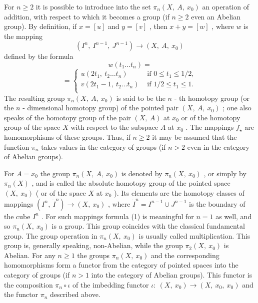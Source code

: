 For $  n \geq 2 $ 
it is possible to introduce into the set $  \pi _{n} ( X ,\  A ,\  x _{0} ) $ 
an operation of addition, with respect to which it becomes a group (if $  n \geq 2 $ 
even an Abelian group). By definition, if $  x = [ u ] $ 
and $  y = [ v ] $ , 
then $  x + y = [ w ] $ , 
where $  w $ 
is the mapping$$ 
( I ^{n} ,\  I ^{n-1} ,\  J ^{n-1} )  
\rightarrow   ( X ,\  A ,\  x _{0} )
 $$ 
defined by the formula$$ \tag{1}
w ( t _{1} \dots t _{n} )  =
 $$ 
$$ 
=  
\left \{ 
\begin{array}{ll}
u ( 2 t _{1} ,\  t _{2} \dots t _{n} )  &  \textrm{ if }  0 \leq t _{1} \leq 1 / 2 ,  \\
v ( 2 t _{1} -1 ,\  t _{2} \dots t _{n} )  &  \textrm{ if }  1 / 2 \leq t _{1} \leq 1 .  \\
\end{array}

 \right .$$
The resulting group $  \pi _{n} ( X ,\  A ,\  x _{0} ) $ 
is said to be the $  n $ -
th homotopy group (or the $  n $ -
dimensional homotopy group) of the pointed pair $  ( X ,\  A ,\  x _{0} ) $ ; 
one also speaks of the homotopy group of the pair $  ( X ,\  A ) $ 
at $  x _{0} $ 
or of the homotopy group of the space $  X $ 
with respect to the subspace $  A $ 
at $  x _{0} $ . 
The mappings $  f _ \star  $ 
are homomorphisms of these groups. Thus, if $  n \geq 2 $ 
it may be assumed that the function $  \pi _{n} $ 
takes values in the category of groups (if $  n > 2 $ 
even in the category of Abelian groups).

For $  A = x _{0} $ 
the group $  \pi _{n} ( X ,\  A ,\  x _{0} ) $ 
is denoted by $  \pi _{n} ( X ,\  x _{0} ) $ , 
or simply by $  \pi _{n} (X) $ , 
and is called the absolute homotopy group of the pointed space $  ( X ,\  x _{0} ) $ (
or of the space $  X $ 
at $  x _{0} $ ). 
Its elements are the homotopy classes of mappings $  ( I ^{n} ,\  \dot{I}  ^{n} ) \rightarrow ( X ,\  x _{0} ) $ , 
where $  \dot{I}  ^{n} = I ^{n-1} \cup J ^{n-1} $ 
is the boundary of the cube $  I ^{n} $ . 
For such mappings formula (1) is meaningful for $  n = 1 $ 
as well, and so $  \pi _{n} ( X ,\  x _{0} ) $ 
is a group. This group coincides with the classical fundamental group. The group operation in $  \pi _{n} ( X ,\  x _{0} ) $ 
is usually called multiplication. This group is, generally speaking, non-Abelian, while the group $  \pi _{2} ( X ,\  x _{0} ) $ 
is Abelian. For any $  n \geq 1 $ 
the groups $  \pi _{n} ( X ,\  x _{0} ) $ 
and the corresponding homomorphisms form a functor from the category of pointed spaces into the category of groups (if $  n > 1 $ 
into the category of Abelian groups). This functor is the composition $  \pi _{n} \circ \iota $ 
of the imbedding functor $  \iota : \  ( X ,\  x _{0} ) \rightarrow ( X ,\  x _{0} ,\  x _{0} ) $ 
and the functor $  \pi _{n} $ 
described above.

